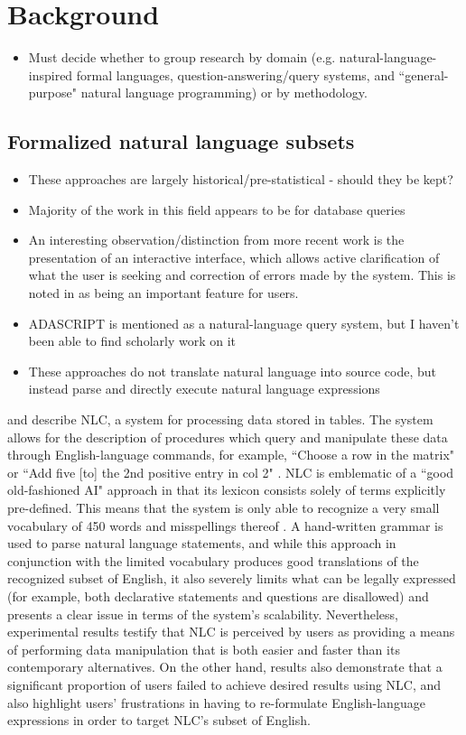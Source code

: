 \documentclass[a4paper,11pt]{proposal}
\begin{document}
\section{Background} \label{sec:back}
\begin{itemize}
\item Must decide whether to group research by domain (e.g. natural-language-inspired formal languages, question-answering/query systems, and ``general-purpose" natural language programming) or by methodology.
\end{itemize}

\subsection{Formalized natural language subsets}
\begin{itemize}
\item These approaches are largely historical/pre-statistical - should they be kept?
\item Majority of the work in this field appears to be for database queries
\item An interesting observation/distinction from more recent work is the presentation of an interactive interface, which allows active clarification of what the user is seeking and correction of errors made by the system. This is noted in \cite{capindale1990} as being an important feature for users.
\item ADASCRIPT is mentioned as a natural-language query system, but I haven't been able to find scholarly work on it
\item These approaches do not translate natural language into source code, but instead parse and directly execute natural language expressions
\end{itemize}

\cite{ballard1979} and \cite{biermann1983} describe NLC, a system for processing data stored in tables. The system allows for the description of procedures which query and manipulate these data through English-language commands, for example, ``Choose a row in the matrix" or ``Add five [to] the 2nd positive entry in col 2" \cite{ballard1979}. NLC is emblematic of a ``good old-fashioned AI" approach in that its lexicon consists solely of terms explicitly pre-defined. This means that the system is only able to recognize a very small vocabulary of 450 words and misspellings thereof \cite{ballard1979}. A hand-written grammar is used to parse natural language statements, and while this approach in conjunction with the limited vocabulary produces good translations of the recognized subset of English, it also severely limits what can be legally expressed (for example, both declarative statements and questions are disallowed) and presents a clear issue in terms of the system's scalability. Nevertheless, experimental results \cite{biermann1983} testify that NLC is perceived by users as providing a means of performing data manipulation that is both easier and faster than its contemporary alternatives. On the other hand, results also demonstrate that a significant proportion of users failed to achieve desired results using NLC, and also highlight users' frustrations in having to re-formulate English-language expressions in order to target NLC's subset of English.
\end{document}
